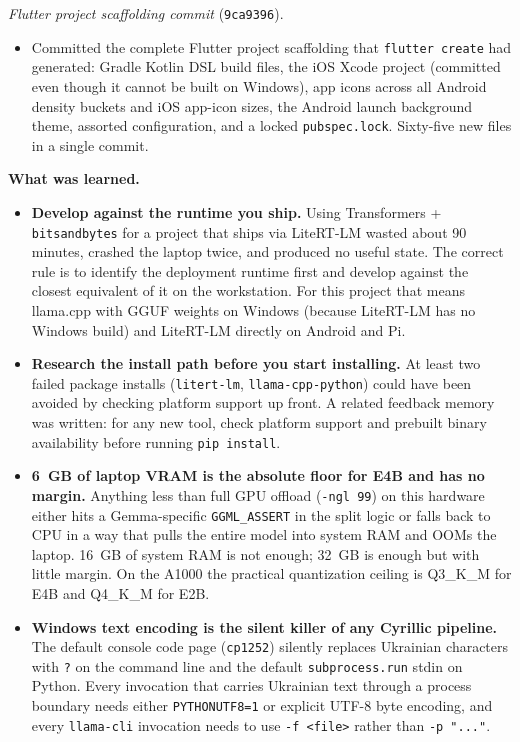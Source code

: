 \documentclass{article}
\theoremstyle{plain}
\theoremstyle{definition}
\theoremstyle{remark}
\begin{document}
\textit{Flutter project scaffolding commit} (\texttt{9ca9396}).
\begin{itemize}
\item Committed the complete Flutter project scaffolding that \texttt{flutter create} had generated: Gradle Kotlin DSL build files, the iOS Xcode project (committed even though it cannot be built on Windows), app icons across all Android density buckets and iOS app-icon sizes, the Android launch background theme, assorted configuration, and a locked \texttt{pubspec.lock}. Sixty-five new files in a single commit.
\end{itemize}

\textbf{What was learned.}
\begin{itemize}
\item \textbf{Develop against the runtime you ship.} Using Transformers + \texttt{bitsandbytes} for a project that ships via LiteRT-LM wasted about 90 minutes, crashed the laptop twice, and produced no useful state. The correct rule is to identify the deployment runtime first and develop against the closest equivalent of it on the workstation. For this project that means llama.cpp with GGUF weights on Windows (because LiteRT-LM has no Windows build) and LiteRT-LM directly on Android and Pi.
\item \textbf{Research the install path before you start installing.} At least two failed package installs (\texttt{litert-lm}, \texttt{llama-cpp-python}) could have been avoided by checking platform support up front. A related feedback memory was written: for any new tool, check platform support and prebuilt binary availability before running \texttt{pip install}.
\item \textbf{6~GB of laptop VRAM is the absolute floor for E4B and has no margin.} Anything less than full GPU offload (\texttt{-ngl 99}) on this hardware either hits a Gemma-specific \texttt{GGML\_ASSERT} in the split logic or falls back to CPU in a way that pulls the entire model into system RAM and OOMs the laptop. 16~GB of system RAM is not enough; 32~GB is enough but with little margin. On the A1000 the practical quantization ceiling is Q3\_K\_M for E4B and Q4\_K\_M for E2B.
\item \textbf{Windows text encoding is the silent killer of any Cyrillic pipeline.} The default console code page (\texttt{cp1252}) silently replaces Ukrainian characters with \texttt{?} on the command line and the default \texttt{subprocess.run} stdin on Python. Every invocation that carries Ukrainian text through a process boundary needs either \texttt{PYTHONUTF8=1} or explicit UTF-8 byte encoding, and every \texttt{llama-cli} invocation needs to use \texttt{-f <file>} rather than \texttt{-p "..."}.

\end{itemize}
\end{document}
